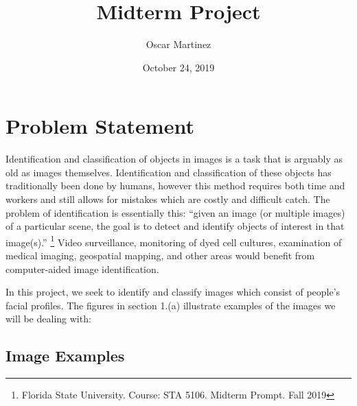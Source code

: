 \documentclass[12pt]{article}
\begin{document}
	
		
	
	\title{ \Huge Midterm Project}
	\author{\large Oscar Martinez}
	\date{October 24, 2019}	
	
	
	\maketitle
	\newpage
	
\section{Problem Statement}
	
	Identification and classification of objects in images is a task that is arguably as old as images themselves. Identification and classification of these objects has traditionally been done by humans, however this method requires both time and workers and still allows for mistakes which are costly and difficult catch. The problem of identification is essentially this:  ``given an image (or multiple images) of a particular scene, the goal is to detect and identify objects of interest in that image(s).'' \footnote{Florida State University. Course: STA 5106. Midterm Prompt. Fall 2019} Video surveillance, monitoring of dyed cell cultures, examination of medical imaging, geospatial mapping, and other areas would benefit from computer-aided image identification. 
	
	In this project, we seek to identify and classify images which consist of people's facial profiles. The figures in section 1.(a) illustrate examples of the images we will be dealing with:
	
	\subsection{Image Examples}
		\begin{center}
		\end{center}
		\begin{center}
		\end{center}
	
\end{document}
